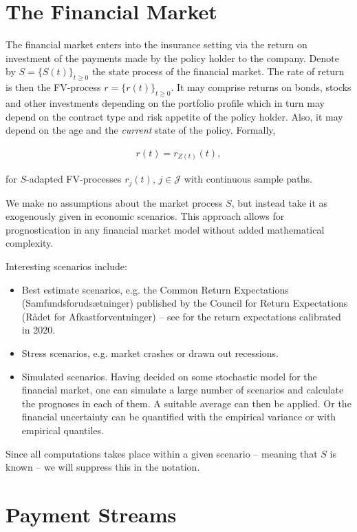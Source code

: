\documentclass{book}
\newcommand{\1}[1]{\mathbbm{1}_{\left\lbrace #1 \right\rbrace}}
\theoremstyle{break}
\theoremstyle{remark}
\numberwithin{equation}{section}
\begin{document}
\section{The Financial Market}

The financial market enters into the insurance setting via the return on investment of the payments made by the policy holder to the company. Denote by $S = \{ S(t) \}_{t \geq 0}$ the state process of the financial market. The rate of return is then the FV-process $r = \{ r(t) \}_{t \geq 0}$. It may comprise returns on bonds, stocks and other investments depending on the portfolio profile which in turn may depend on the contract type and risk appetite of the policy holder. Also, it may depend on the age and the \textit{current} state of the policy. Formally,

\begin{align*}
	r(t) = r_{Z(t)}(t),
\end{align*}

for $S$-adapted FV-processes $r_j(t)$, $j \in \mathcal{J}$ with continuous sample paths.

We make no assumptions about the market process $S$, but instead take it as exogenously given in economic scenarios. This approach allows for prognostication in any financial market model without added mathematical complexity.

Interesting scenarios include:

\begin{itemize}
	\item Best estimate scenarios, e.g. the Common Return Expectations (Samfundsforudsætninger) published by the Council for Return Expectations (Rådet for Afkastforventninger) -- see \cite{ReturnExpectations2020} for the return expectations calibrated in 2020.
	\item Stress scenarios, e.g. market crashes or drawn out recessions.
	\item Simulated scenarios. Having decided on some stochastic model for the financial market, one can simulate a large number of scenarios and calculate the prognoses in each of them. A suitable average can then be applied. Or the financial uncertainty can be quantified with the empirical variance or with empirical quantiles.
\end{itemize}

Since all computations takes place within a given scenario -- meaning that $S$ is known -- we will suppress this in the notation.

\section{Payment Streams}
\end{document}
